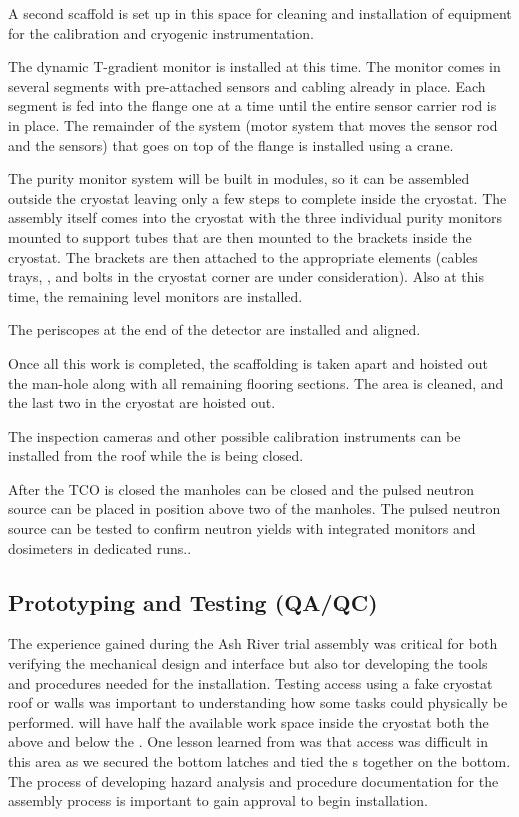 A second scaffold is set up in this space  for cleaning and installation of equipment for the calibration and cryogenic instrumentation.

The dynamic T-gradient monitor is installed at this time. 
The monitor comes in several segments with pre-attached sensors and cabling already in place. Each segment is fed into the flange one at a time until the entire sensor carrier rod is in place. The remainder of the system (motor system that moves the sensor rod and the sensors) that goes on top of the flange is installed using a crane. 

The purity monitor system will be built in modules, so it can be assembled outside the cryostat leaving only a few steps to complete inside the cryostat. 
The assembly itself comes into the cryostat with the three individual purity monitors mounted to support tubes that are then mounted to the brackets inside the cryostat. The brackets are then attached to the appropriate elements (cables trays, , and bolts in the cryostat corner are under consideration). Also at this time, the remaining level monitors are installed.

The periscopes at the end of the detector are installed and aligned. 

Once all this work is completed, the scaffolding is taken apart and hoisted out the man-hole along with all remaining flooring sections. The area is cleaned, and the last two  in the cryostat are hoisted out. 

The inspection cameras and other possible calibration instruments can be installed from the roof while the  is being closed.

After the TCO is closed the manholes can be closed and the pulsed neutron source can be placed in position above two of the manholes. The pulsed neutron source can be tested to confirm neutron yields with integrated monitors and dosimeters in dedicated runs..





\subsection{Prototyping and Testing (QA/QC)}
\label{sec:fdsp-tc-inst-qaqc}

The experience gained during the  Ash River trial assembly was critical for both verifying the mechanical design and interface but also tor developing the tools and procedures needed for the installation.
Testing access using a fake cryostat roof or walls was important to understanding how some tasks could physically be performed. 
 will have half the available work space inside the cryostat both the above and below the .  One lesson learned from  was that access was difficult in this area as we secured the bottom latches and tied the s together on the bottom.  The process of developing hazard analysis and procedure documentation for the assembly process is important to gain approval to begin installation.   

